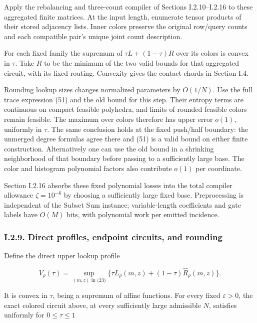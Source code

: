 Apply the rebalancing and three-count compiler of Sections I.2.10--I.2.16 to these aggregated finite matrices. At the input length, enumerate tensor products of their stored adjacency lists. Inner colors preserve the original row/query counts and each compatible pair's unique joint count description.

For each fixed family the supremum of \(\tau L+(1-\tau)R\) over its colors is convex in \(\tau\). Take \(R\) to be the minimum of the two valid bounds for that aggregated circuit, with its fixed routing. Convexity gives the contact chords in Section I.4.

Rounding lookup sizes changes normalized parameters by \(O(1/N)\). Use the full trace expression (51) and the old bound for this step. Their entropy terms are continuous on compact feasible polyhedra, and limits of rounded feasible colors remain feasible. The maximum over colors therefore has upper error \(o(1)\), uniformly in \(\tau\). The same conclusion holds at the fixed push/half boundary: the unmerged degree formulas agree there and (51) is a valid bound on either finite construction. Alternatively one can use the old bound in a shrinking neighborhood of that boundary before passing to a sufficiently large base. The color and histogram polynomial factors also contribute \(o(1)\) per coordinate.

Section I.2.16 absorbs these fixed polynomial losses into the total compiler allowance \(\zeta=10^{-6}\) by choosing a sufficiently large fixed base. Preprocessing is independent of the Subset Sum instance; variable-length coefficients and gate labels have \(O(M)\) bits, with polynomial work per emitted incidence.

\hypertarget{af-a9ec399514-i.2.9.-direct-profiles-endpoint-circuits-and-rounding}{%
\subsubsection{I.2.9. Direct profiles, endpoint circuits, and rounding}\label{af-a9ec399514-i.2.9.-direct-profiles-endpoint-circuits-and-rounding}}

Define the direct upper lookup profile

\[
V_\rho(\tau)=\sup_{(m,z)\text{ in (23)}}
 \{\tau L_\rho(m,z)+(1-\tau)\widehat R_\rho(m,z)\}.
\tag{58}
\]

It is convex in \(\tau\), being a supremum of affine functions. For every fixed \(\varepsilon>0\), the exact colored circuit above, at every sufficiently large admissible \(N\), satisfies uniformly for \(0\le\tau\le1\)

